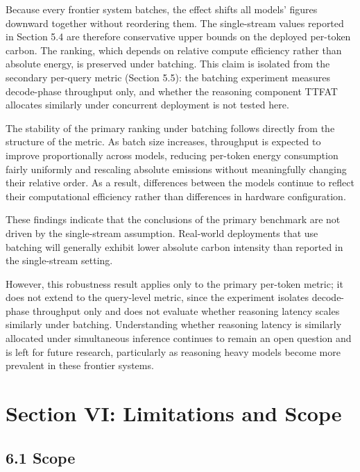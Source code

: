 \documentclass[11pt]{article}
\begin{document}
Because every frontier system batches, the effect shifts all models' figures downward together without reordering them. The single-stream values reported in Section 5.4 are therefore conservative upper bounds on the deployed per-token carbon. The ranking, which depends on relative compute efficiency rather than absolute energy, is preserved under batching. This claim is isolated from the secondary per-query metric (Section 5.5): the batching experiment measures decode-phase throughput only, and whether the reasoning component TTFAT allocates similarly under concurrent deployment is not tested here.

The stability of the primary ranking under batching follows directly from the structure of the metric. As batch size increases, throughput is expected to improve proportionally across models, reducing per-token energy consumption fairly uniformly and rescaling absolute emissions without meaningfully changing their relative order. As a result, differences between the models continue to reflect their computational efficiency rather than differences in hardware configuration.

These findings indicate that the conclusions of the primary benchmark are not driven by the single-stream assumption. Real-world deployments that use batching will generally exhibit lower absolute carbon intensity than reported in the single-stream setting.

However, this robustness result applies only to the primary per-token metric; it does not extend to the query-level metric, since the experiment isolates decode-phase throughput only and does not evaluate whether reasoning latency scales similarly under batching. Understanding whether reasoning latency is similarly allocated under simultaneous inference continues to remain an open question and is left for future research, particularly as reasoning heavy models become more prevalent in these frontier systems.

\section*{Section VI: Limitations and Scope}

\subsection*{6.1 Scope}
\end{document}

